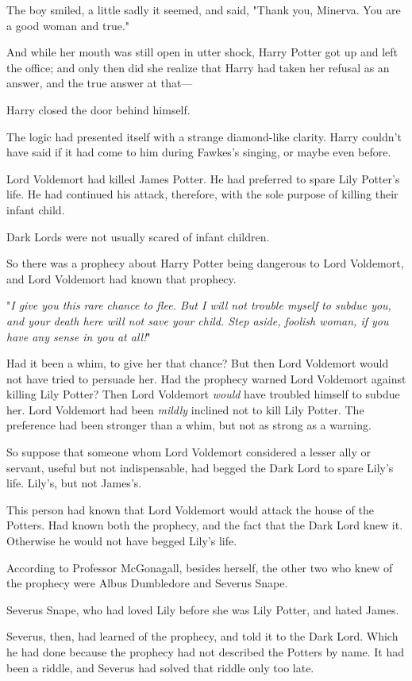 The boy smiled, a little sadly it seemed, and said, "Thank you, Minerva. You
are a good woman and true."

And while her mouth was still open in utter shock, Harry Potter got up and left
the office; and only then did she realize that Harry had taken her refusal as
an answer, and the true answer at that---

Harry closed the door behind himself.

The logic had presented itself with a strange diamond-like clarity. Harry
couldn't have said if it had come to him during Fawkes's singing, or maybe even
before.

Lord Voldemort had killed James Potter. He had preferred to spare Lily Potter's
life. He had continued his attack, therefore, with the sole purpose of killing
their infant child.

Dark Lords were not usually scared of infant children.

So there was a prophecy about Harry Potter being dangerous to Lord Voldemort,
and Lord Voldemort had known that prophecy.

"\emph{I give you this rare chance to flee. But I will not trouble myself to
subdue you, and your death here will not save your child. Step aside, foolish
woman, if you have any sense in you at all!}"

Had it been a whim, to give her that chance? But then Lord Voldemort would not
have tried to persuade her. Had the prophecy warned Lord Voldemort against
killing Lily Potter? Then Lord Voldemort \emph{would} have troubled himself to
subdue her. Lord Voldemort had been \emph{mildly} inclined not to kill Lily
Potter. The preference had been stronger than a whim, but not as strong as a
warning.

So suppose that someone whom Lord Voldemort considered a lesser ally or
servant, useful but not indispensable, had begged the Dark Lord to spare Lily's
life. Lily's, but not James's.

This person had known that Lord Voldemort would attack the house of the
Potters. Had known both the prophecy, and the fact that the Dark Lord knew it.
Otherwise he would not have begged Lily's life.

According to Professor McGonagall, besides herself, the other two who knew of
the prophecy were Albus Dumbledore and Severus Snape.

Severus Snape, who had loved Lily before she was Lily Potter, and hated James.

Severus, then, had learned of the prophecy, and told it to the Dark Lord. Which
he had done because the prophecy had not described the Potters by name. It had
been a riddle, and Severus had solved that riddle only too late.

